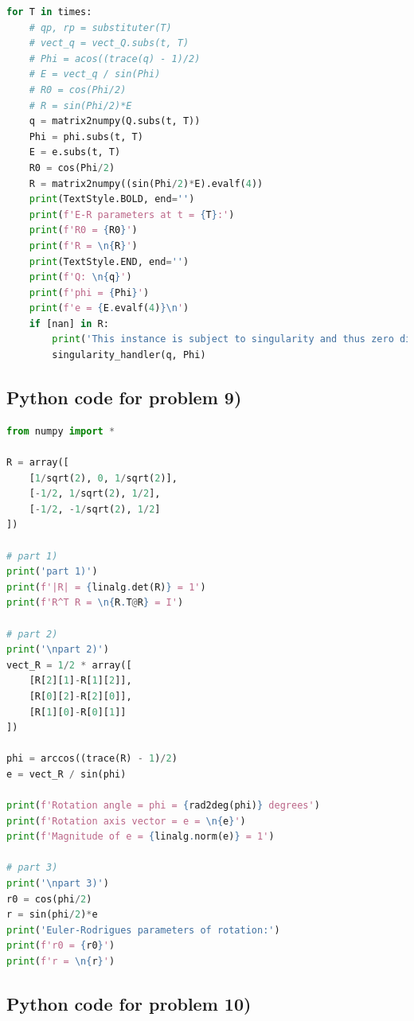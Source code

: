 \documentclass[conference]{IEEEtran}
\begin{document}
\begin{lstlisting}[language=Python]
for T in times:
    # qp, rp = substituter(T)
    # vect_q = vect_Q.subs(t, T)
    # Phi = acos((trace(q) - 1)/2)
    # E = vect_q / sin(Phi)
    # R0 = cos(Phi/2)
    # R = sin(Phi/2)*E
    q = matrix2numpy(Q.subs(t, T))
    Phi = phi.subs(t, T)
    E = e.subs(t, T)
    R0 = cos(Phi/2)
    R = matrix2numpy((sin(Phi/2)*E).evalf(4))
    print(TextStyle.BOLD, end='')
    print(f'E-R parameters at t = {T}:')
    print(f'R0 = {R0}')
    print(f'R = \n{R}')
    print(TextStyle.END, end='')
    print(f'Q: \n{q}')
    print(f'phi = {Phi}')
    print(f'e = {E.evalf(4)}\n')
    if [nan] in R:
        print('This instance is subject to singularity and thus zero division problem. \nBy handling the singularity, the new E-R parameters are derived.')
        singularity_handler(q, Phi)
\end{lstlisting}

\subsection{Python code for problem 9)}

\begin{lstlisting}[language=Python]
from numpy import *

R = array([
    [1/sqrt(2), 0, 1/sqrt(2)],
    [-1/2, 1/sqrt(2), 1/2],
    [-1/2, -1/sqrt(2), 1/2]
])

# part 1)
print('part 1)')
print(f'|R| = {linalg.det(R)} = 1')
print(f'R^T R = \n{R.T@R} = I')

# part 2)
print('\npart 2)')
vect_R = 1/2 * array([
    [R[2][1]-R[1][2]],
    [R[0][2]-R[2][0]],
    [R[1][0]-R[0][1]]
])

phi = arccos((trace(R) - 1)/2)
e = vect_R / sin(phi)

print(f'Rotation angle = phi = {rad2deg(phi)} degrees')
print(f'Rotation axis vector = e = \n{e}')
print(f'Magnitude of e = {linalg.norm(e)} = 1')

# part 3)
print('\npart 3)')
r0 = cos(phi/2)
r = sin(phi/2)*e
print('Euler-Rodrigues parameters of rotation:')
print(f'r0 = {r0}')
print(f'r = \n{r}')
\end{lstlisting}



\subsection{Python code for problem 10)}
\end{document}
